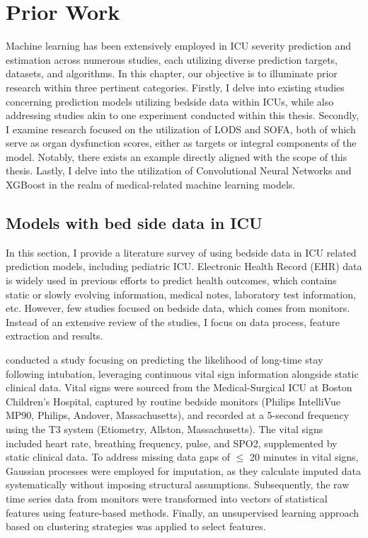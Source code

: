 \documentclass[12pt,a4paper,english
]{tunithesis}
\begin{document}
\chapter{Prior Work}
\label{ch:priorwork}
Machine learning has been extensively employed in ICU severity prediction and estimation across numerous studies, each utilizing diverse prediction targets, datasets, and algorithms. In this chapter, our objective is to illuminate prior research within three pertinent categories. Firstly, I delve into existing studies concerning prediction models utilizing bedside data within ICUs, while also addressing studies akin to one experiment conducted within this thesis. Secondly, I examine research focused on the utilization of LODS and SOFA, both of which serve as organ dysfunction scores, either as targets or integral components of the model. Notably, there exists an example directly aligned with the scope of this thesis. Lastly, I delve into the utilization of Convolutional Neural Networks and XGBoost in the realm of medical-related machine learning models. 

\section{Models with bed side data in ICU}
In this section, I provide a literature survey of using bedside data in ICU related prediction models, including pediatric ICU. Electronic Health Record (EHR) data is widely used in previous efforts to predict health outcomes, which contains static or slowly evolving information, medical notes, laboratory test information, etc. However, few studies focused on bedside data, which comes from monitors. Instead of an extensive review of the studies, I focus on data process, feature extraction and results.

\textcite{mitdavid2020} conducted a study focusing on predicting the likelihood of long-time stay following intubation, leveraging continuous vital sign information alongside static clinical data. Vital signs were sourced from the Medical-Surgical ICU at Boston Children's Hospital, captured by routine bedside monitors (Philips IntelliVue MP90, Philips, Andover, Massachusetts), and recorded at a 5-second frequency using the T3 system (Etiometry, Allston, Massachusetts). The vital signs included heart rate, breathing frequency, pulse, and SPO2, supplemented by static clinical data. To address missing data gaps of $\leq$ 20 minutes in vital signs, Gaussian processes were employed for imputation, as they calculate imputed data systematically without imposing structural assumptions. Subsequently, the raw time series data from monitors were transformed into vectors of statistical features using feature-based methods. Finally, an unsupervised learning approach based on clustering strategies was applied to select features. 
\end{document}
